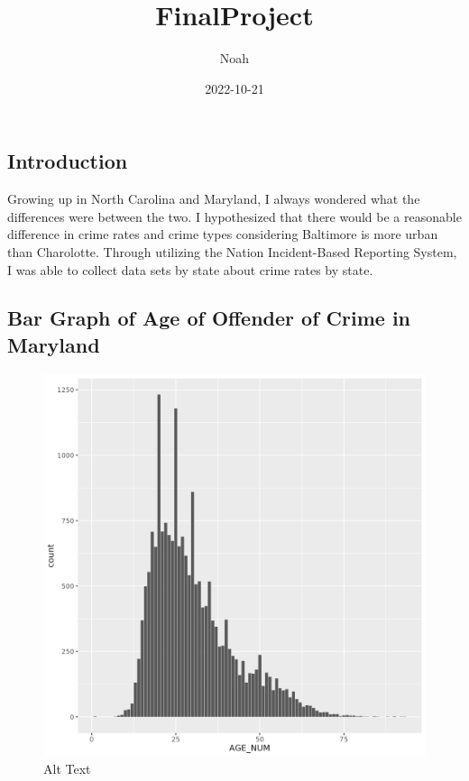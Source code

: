 \documentclass[
]{article}
\title{FinalProject}
\author{Noah}
\date{2022-10-21}
\begin{document}
\maketitle

\hypertarget{introduction}{%
\subsection{Introduction}\label{introduction}}

Growing up in North Carolina and Maryland, I always wondered what the
differences were between the two. I hypothesized that there would be a
reasonable difference in crime rates and crime types considering
Baltimore is more urban than Charolotte. Through utilizing the Nation
Incident-Based Reporting System, I was able to collect data sets by
state about crime rates by state.

\hypertarget{bar-graph-of-age-of-offender-of-crime-in-maryland}{%
\subsection{Bar Graph of Age of Offender of Crime in
Maryland}\label{bar-graph-of-age-of-offender-of-crime-in-maryland}}

\begin{figure}
\centering
\includegraphics{./figures/bar_age_graph.png}
\caption{Alt Text}
\end{figure}
\end{document}
